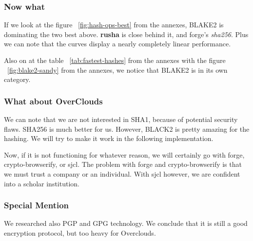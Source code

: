 \subsubsection{Now what}

If we look at the figure ~\ref{fig:hash-ops-best} from the annexes, BLAKE2 is dominating the two best above. \textbf{rusha} is close behind it, and forge's \textit{sha256}. Plus we can note that the curves display a nearly completely linear performance.

Also on at the table ~\ref{tab:fastest-hashes} from the annexes with the figure ~\ref{fig:blake2-sandy} from the annexes, we notice that BLAKE2 is in its own category. 

\subsubsection{What about OverClouds}

We can note that we are not interested in SHA1, because of potential security flaws. SHA256 is much better for us. However, BLACK2 is pretty amazing for the hashing. We will try to make it work in the following implementation.

Now, if it is not functioning for whatever reason, we will certainly go with forge, crypto-browserify, or sjcl. The problem with forge and crypto-browserify is that we must trust a company or an individual. With sjcl however, we are confident into a scholar institution.

\subsubsection{Special Mention} We researched also PGP\cite{PGP2005PGPDirectory} and GPG\cite{Koch2008UsingGuard} technology. We conclude that it is still a good encryption protocol, but too heavy for Overclouds.

